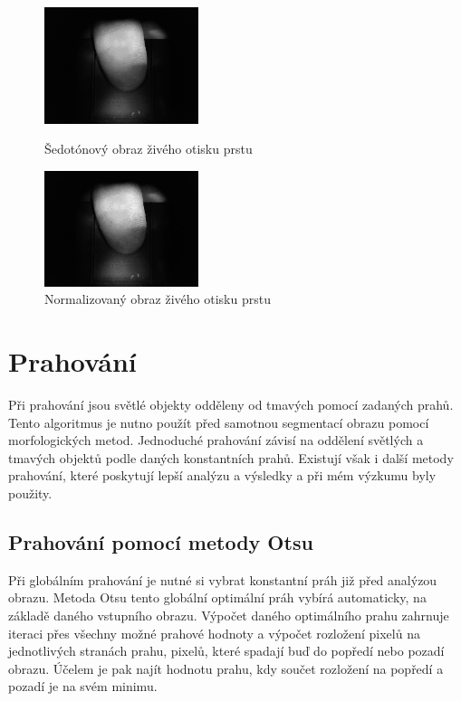 \begin{figure}[htbp]
  \begin{minipage}[b]{0.5\linewidth}
    \centering
    \includegraphics[width=170px]{obrazky-figures/live87grayscale.png}
    \caption{Šedotónový obraz živého otisku prstu}
  \end{minipage}
  \hspace{0.5cm}
  \begin{minipage}[b]{0.5\linewidth}
    \centering
    \includegraphics[width=170px]{obrazky-figures/live87norm.png}
    \caption{Normalizovaný obraz živého otisku prstu}
  \end{minipage}
\end{figure}



\section{Prahování}
Při prahování jsou světlé objekty odděleny od tmavých pomocí zadaných prahů. Tento algoritmus je nutno použít před samotnou segmentací obrazu pomocí morfologických metod. Jednoduché prahování závisí na oddělení světlých a tmavých objektů podle daných konstantních prahů. Existují však i další metody prahování, které poskytují lepší analýzu a výsledky a při mém výzkumu byly použity.

\subsection{Prahování pomocí metody Otsu}
Při globálním prahování je nutné si vybrat konstantní práh již před analýzou obrazu. Metoda Otsu tento globální optimální práh vybírá automaticky, na základě daného vstupního obrazu. \cite{OpenCVTresholding} Výpočet daného optimálního prahu zahrnuje iteraci přes všechny možné prahové hodnoty a výpočet rozložení pixelů na jednotlivých stranách prahu, pixelů, které spadají buď do popředí nebo pozadí obrazu. Účelem je pak najít hodnotu prahu, kdy součet rozložení na popředí a pozadí je na svém minimu. \cite{LabBookPagesTresholding}

